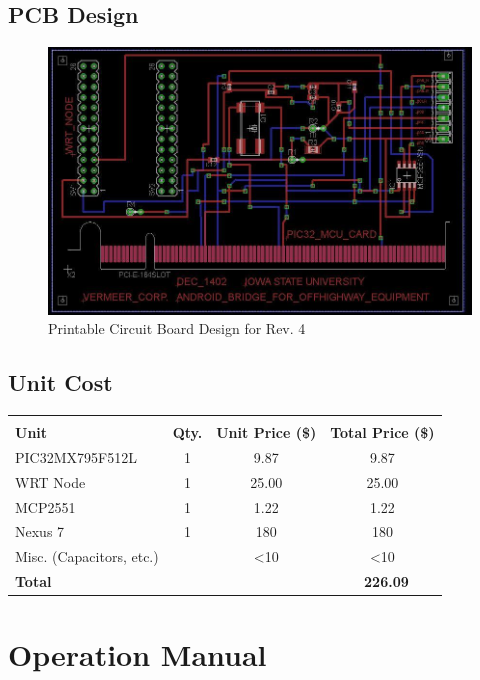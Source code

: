 \documentclass[paper=a4, fontsize=11pt]{scrartcl}
\numberwithin{equation}{section}		%
\numberwithin{figure}{section}			%
\numberwithin{table}{section}				%
\begin{document}
\subsection{PCB Design}
 \begin{figure}[ht]
	 \center\includegraphics[scale=0.3]{PCB.jpg}
 \caption{Printable Circuit Board Design for Rev. 4}
 \end{figure}

 \subsection{Unit Cost}
 \vspace{10pt}
 \begin{center}
 \begin{tabular}{l c c c}
	\hline\\
	 \textbf{Unit} & \textbf{Qty.} & \textbf{Unit Price (\$)} & \textbf{Total Price (\$)} \\ [1ex]
	 PIC32MX795F512L & 1 & 9.87 & 9.87 \\ [1ex]
	 WRT Node & 1 & 25.00 & 25.00 \\ [1ex]
	 MCP2551 & 1 & 1.22 & 1.22 \\ [1ex]
	 Nexus 7 & 1 & 180 & 180 \\ [1ex]
	 Misc. (Capacitors, etc.) & & <10 & <10 \\ [1ex] \cline{4-4}
	 \textbf{Total}&&& \textbf{~226.09} \\ [1ex]
	\hline
\end{tabular}
\end{center}
 

 \section{Operation Manual}
\end{document}
